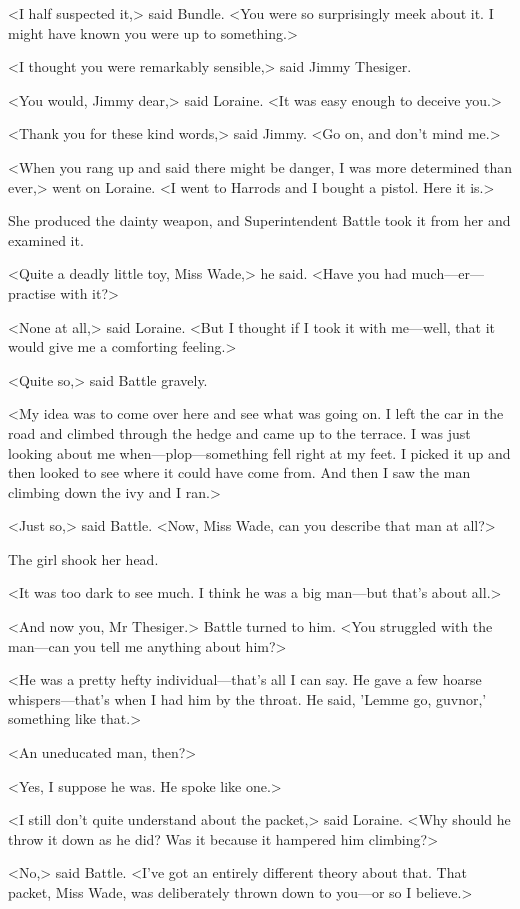 <I half suspected it,> said Bundle. <You were so surprisingly meek about it. I might have known you were up to something.>

<I thought you were remarkably sensible,> said Jimmy Thesiger.

<You would, Jimmy dear,> said Loraine. <It was easy enough to deceive you.>

<Thank you for these kind words,> said Jimmy. <Go on, and don't mind me.>

<When you rang up and said there might be danger, I was more determined than ever,> went on Loraine. <I went to Harrods and I bought a pistol. Here it is.>

She produced the dainty weapon, and Superintendent Battle took it from her and examined it.

<Quite a deadly little toy, Miss Wade,> he said. <Have you had much—er—practise with it?>

<None at all,> said Loraine. <But I thought if I took it with me—well, that it would give me a comforting feeling.>

<Quite so,> said Battle gravely.

<My idea was to come over here and see what was going on. I left the car in the road and climbed through the hedge and came up to the terrace. I was just looking about me when—plop—something fell right at my feet. I picked it up and then looked to see where it could have come from. And then I saw the man climbing down the ivy and I ran.>

<Just so,> said Battle. <Now, Miss Wade, can you describe that man at all?>

The girl shook her head.

<It was too dark to see much. I think he was a big man—but that's about all.>

<And now you, Mr Thesiger.> Battle turned to him. <You struggled with the man—can you tell me anything about him?>

<He was a pretty hefty individual—that's all I can say. He gave a few hoarse whispers—that's when I had him by the throat. He said, 'Lemme go, guvnor,' something like that.>

<An uneducated man, then?>

<Yes, I suppose he was. He spoke like one.>

<I still don't quite understand about the packet,> said Loraine. <Why should he throw it down as he did? Was it because it hampered him climbing?>

<No,> said Battle. <I've got an entirely different theory about that. That packet, Miss Wade, was deliberately thrown down to you—or so I believe.>


